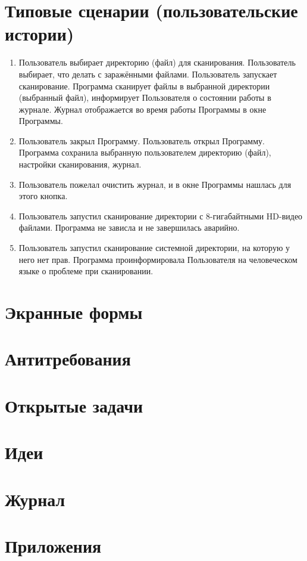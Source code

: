 \section{Типовые сценарии (пользовательские истории)}
\begin{enumerate}
\item Пользователь выбирает директорию (файл) для сканирования. Пользователь выбирает, что делать с заражёнными файлами. Пользователь запускает сканирование. Программа сканирует файлы в выбранной директории (выбранный файл), информирует Пользователя о состоянии работы в журнале. Журнал отображается во время работы Программы в окне Программы.
\item Пользователь закрыл Программу. Пользователь открыл Программу. Программа сохранила выбранную пользователем директорию (файл), настройки сканирования, журнал.
\item Пользователь пожелал очистить журнал, и в окне Программы нашлась для этого кнопка.
\item Пользователь запустил сканирование директории с 8-гигабайтными HD-видео файлами. Программа не зависла и не завершилась аварийно.
\item Пользователь запустил сканирование системной директории, на которую у него нет прав. Программа проинформировала Пользователя на человеческом языке о проблеме при сканировании.
\end{enumerate}
\section{Экранные формы}
\section{Антитребования}
\section{Открытые задачи}
\section{Идеи}
\section{Журнал}
\section{Приложения}
